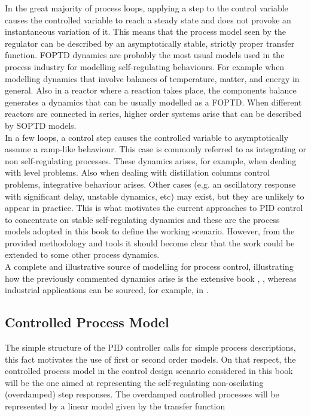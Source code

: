 In the great majority of process loops, applying a step to the control variable causes the controlled variable to reach a steady state and does not provoke an instantaneous variation of it. This means that the process model seen by the regulator can be described by an asymptotically stable, strictly proper transfer function. FOPTD dynamics are probably the most usual models used in the process industry for modelling self-regulating behaviours. For example when modelling dynamics that involve balances of temperature, matter, and energy in general. Also in a reactor where a reaction takes place, the components balance generates a dynamics that can be usually modelled as a FOPTD. When different reactors are connected in series, higher order systems arise that can be described by SOPTD models. \\

In a few loops, a control step causes the controlled variable to asymptotically assume a ramp-like behaviour. This case is commonly referred to as  integrating or non self-regulating processes. These dynamics arises, for example, when dealing with level problems. Also when dealing with distillation columns control problems, integrative behaviour arises. Other cases (e.g. an oscillatory response with significant delay, unstable dynamics, etc) may exist, but they are unlikely to appear in practice. This is what motivates the current approaches to PID control to concentrate on stable self-regulating dynamics and these are the process models adopted in this book to define the working scenario. However, from the provided methodology and tools it should become clear that the work could be extended to some other process dynamics.  \\

A complete and illustrative source of modelling for process control, illustrating how the previously commented dynamics arise is the extensive book \cite{MarlinBook}, , whereas industrial applications can be sourced, for example, in  \cite{VilanovaBook2012}.


\subsection{Controlled Process Model}
\label{sec:2.1}

The simple structure of the PID controller calls for simple process descriptions, this fact motivates the use of first or second order models. On that respect, the controlled process model in the control design scenario considered in this book will be the one aimed at representing the self-regulating non-oscilating (overdamped) step responses. The overdamped controlled processes will be represented by a linear model given by the transfer function

